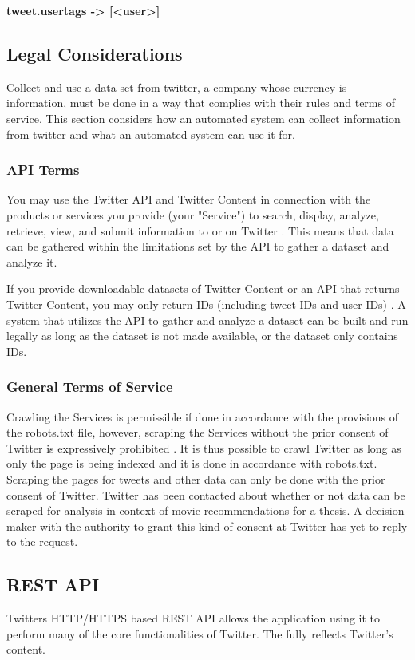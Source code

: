 \textbf{tweet.usertags -> [<user>]}

\subsection{Legal Considerations}
Collect and use a data set from twitter, a company whose currency is information, must be done in a way that complies with their rules and terms of service. This section considers how an automated system can collect information from twitter and what an automated system can use it for.

\subsubsection{API Terms}
You may use the Twitter API and Twitter Content in connection with the products or services you provide (your "Service") to search, display, analyze, retrieve, view, and submit information to or on Twitter \cite{twitter-api-terms}. This means that data can be gathered within the limitations set by the API to gather a dataset and analyze it.

If you provide downloadable datasets of Twitter Content or an API that returns Twitter Content, you may only return IDs (including tweet IDs and user IDs) \cite{twitter-api-terms}. A system that utilizes the API to gather and analyze a dataset can be built and run legally as long as the dataset is not made available, or the dataset only contains IDs.

\subsubsection{General Terms of Service}
Crawling the Services is permissible if done in accordance with the provisions of the robots.txt \cite{twitter-robots-txt} file, however, scraping the Services without the prior consent of Twitter is expressively prohibited \cite{twitter-tos}. It is thus possible to crawl Twitter as long as only the page is being indexed and it is done in accordance with robots.txt. Scraping the pages for tweets and other data can only be done with the prior consent of Twitter. Twitter has been contacted about whether or not data can be scraped for analysis in context of movie recommendations for a thesis. A decision maker with the authority to grant this kind of consent at Twitter has yet to reply to the request.


\subsection{REST API}
Twitters HTTP/HTTPS based REST API allows the application using it to perform many of the core functionalities of Twitter. The fully reflects Twitter's content.

